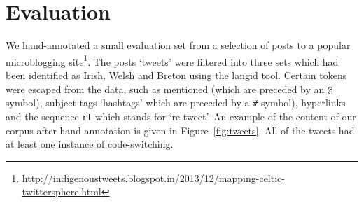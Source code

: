 \documentclass[11pt]{article}
\begin{document}


%
%


\section{Evaluation}
\label{sec:eval}

We hand-annotated a small evaluation set from a selection of posts to a popular microblogging site\footnote{\url{http://indigenoustweets.blogspot.in/2013/12/mapping-celtic-twittersphere.html}}. The posts `tweets' were filtered into three sets which had been identified as Irish, Welsh and Breton using the langid tool.  Certain tokens were escaped from the data, such as mentioned (which are preceded by an \texttt{@} symbol), subject tags `hashtags' which are preceded by a \texttt{\#} symbol), hyperlinks and the sequence \texttt{rt} which stands for `re-tweet'. An example of the content of our corpus after hand annotation is given in Figure~\ref{fig:tweets}. All of the tweets had at least one instance of code-switching.
\end{document}
